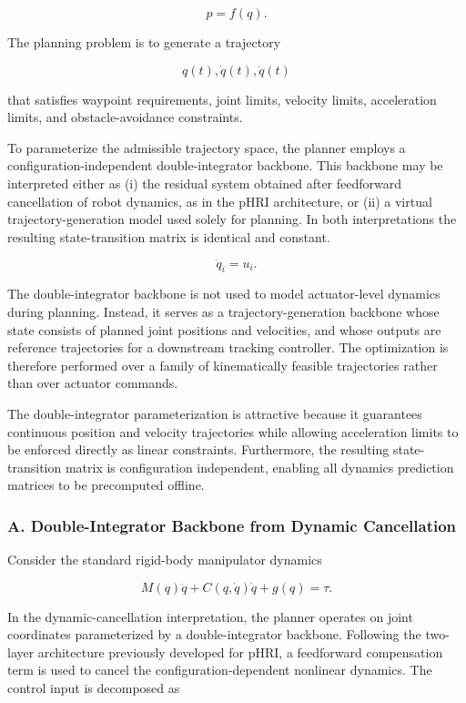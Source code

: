 \[
p=f(q).
\]

The planning problem is to generate a trajectory

\[
q(t),\dot q(t),\ddot q(t)
\]

that satisfies waypoint requirements, joint limits, velocity limits,
acceleration limits, and obstacle-avoidance constraints.

To parameterize the admissible trajectory space, the planner employs a
configuration-independent double-integrator backbone. This backbone may
be interpreted either as (i) the residual system obtained after
feedforward cancellation of robot dynamics, as in the pHRI architecture,
or (ii) a virtual trajectory-generation model used solely for planning.
In both interpretations the resulting state-transition matrix is
identical and constant.

\[
\ddot q_i=u_i.
\]

The double-integrator backbone is not used to model actuator-level
dynamics during planning. Instead, it serves as a trajectory-generation
backbone whose state consists of planned joint positions and velocities,
and whose outputs are reference trajectories for a downstream tracking
controller. The optimization is therefore performed over a family of
kinematically feasible trajectories rather than over actuator commands.

The double-integrator parameterization is attractive because it
guarantees continuous position and velocity trajectories while allowing
acceleration limits to be enforced directly as linear constraints.
Furthermore, the resulting state-transition matrix is configuration
independent, enabling all dynamics prediction matrices to be precomputed
offline.

\subsubsection{A. Double-Integrator Backbone from Dynamic
Cancellation}\label{a.-double-integrator-backbone-from-dynamic-cancellation}

Consider the standard rigid-body manipulator dynamics

\[ M(q)\ddot q + C(q,\dot q)\dot q + g(q)=\tau . \]

In the dynamic-cancellation interpretation, the planner operates on
joint coordinates parameterized by a double-integrator backbone.
Following the two-layer architecture previously developed for pHRI, a
feedforward compensation term is used to cancel the
configuration-dependent nonlinear dynamics. The control input is
decomposed as

